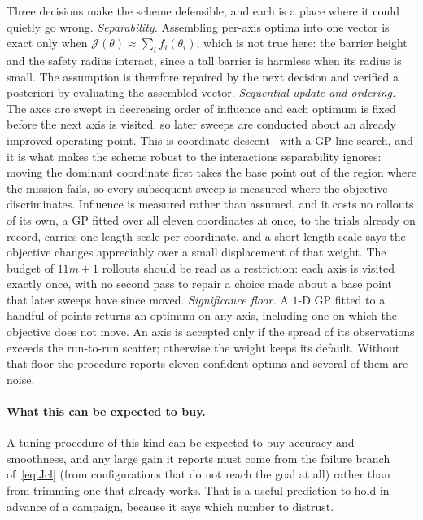 \documentclass[11pt,a4paper]{article}
\begin{document}
Three decisions make the scheme defensible, and each is a place where it could quietly go wrong.
\emph{Separability.} Assembling per-axis optima into one vector is exact only when
$\mathcal{J}(\theta)\approx\sum_i f_i(\theta_i)$, which is not true here: the barrier height and the safety
radius interact, since a tall barrier is harmless when its radius is small. The assumption is therefore
repaired by the next decision and verified a posteriori by evaluating the assembled vector.
\emph{Sequential update and ordering.} The axes are swept in decreasing order of influence and each optimum
is fixed before the next axis is visited, so later sweeps are conducted about an already improved operating
point. This is coordinate descent~\cite{wright2015coordinate} with a GP line search, and it is what makes the scheme robust to the
interactions separability ignores: moving the dominant coordinate first takes the base point out of the
region where the mission fails, so every subsequent sweep is measured where the objective discriminates.
Influence is measured rather than assumed, and it costs no rollouts of its own, a GP fitted over all
eleven coordinates at once, to the trials already on record, carries one length scale per coordinate, and a
short length scale says the objective changes appreciably over a small displacement of that weight. The
budget of $11m+1$ rollouts should be read as a restriction: each axis is visited exactly once, with no
second pass to repair a choice made about a base point that later sweeps have since moved.
\emph{Significance floor.} A $1$-D GP fitted to a handful of points returns an optimum on any axis, including
one on which the objective does not move. An axis is accepted only if the spread of its observations exceeds
the run-to-run scatter; otherwise the weight keeps its default. Without that floor the procedure reports
eleven confident optima and several of them are noise.

\paragraph{What this can be expected to buy.} A tuning procedure of this kind can be expected to buy accuracy
and smoothness, and any large gain it reports must come from the failure branch of~\eqref{eq:Jcl} (from
configurations that do not reach the goal at all) rather than from trimming one that already works. That
is a useful prediction to hold in advance of a campaign, because it says which number to distrust.

\end{document}
